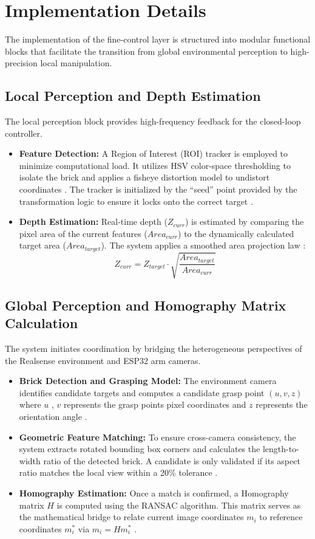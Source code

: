\documentclass{article}
\begin{document}
\section{Implementation Details}

The implementation of the fine-control layer is structured into modular functional blocks that facilitate the transition from global environmental perception to high-precision local manipulation.

\subsection{Local Perception and Depth Estimation}
The local perception block provides high-frequency feedback for the closed-loop controller.
\begin{itemize}
    \item \textbf{Feature Detection:} A Region of Interest (ROI) tracker is employed to minimize computational load. It utilizes HSV color-space thresholding to isolate the brick and applies a fisheye distortion model to undistort coordinates . The tracker is initialized by the ``seed'' point provided by the transformation logic to ensure it locks onto the correct target .
    \item \textbf{Depth Estimation:} Real-time depth ($Z_{curr}$) is estimated by comparing the pixel area of the current features ($Area_{curr}$) to the dynamically calculated target area ($Area_{target}$). The system applies a smoothed area projection law :
    \begin{equation}
        Z_{curr} = Z_{target} \cdot \sqrt{\frac{Area_{target}}{Area_{curr}}}
    \end{equation}
\end{itemize}

\subsection{Global Perception and Homography Matrix Calculation}
The system initiates coordination by bridging the heterogeneous perspectives of the Realsense environment and ESP32 arm cameras. 
\begin{itemize}
    \item \textbf{Brick Detection and Grasping Model:} The environment camera identifies candidate targets and computes a candidate grasp point $(u, v , z) $where $u$ , $v$  represents the grasp points pixel coordinates and $z$ represents the orientation angle .
    \item \textbf{Geometric Feature Matching:} To ensure cross-camera consistency, the system extracts rotated bounding box corners and calculates the length-to-width ratio of the detected brick. A candidate is only validated if its aspect ratio matches the local view within a 20\% tolerance .
    \item \textbf{Homography Estimation:} Once a match is confirmed, a Homography matrix $H$ is computed using the RANSAC algorithm. This matrix serves as the mathematical bridge to relate current image coordinates $m_i$ to reference coordinates $m_i^*$ via $m_i = H m_i^*$ .
\end{itemize}
\end{document}
